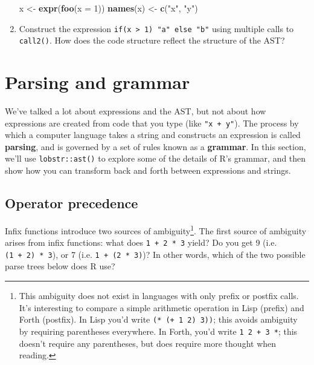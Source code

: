 \documentclass[]{book}
\newenvironment{Shaded}{\begin{snugshade}}{\end{snugshade}}
\newcommand{\DataTypeTok}[1]{\textcolor[rgb]{0.27,0.27,0.27}{#1}}
\newcommand{\DecValTok}[1]{\textcolor[rgb]{0.06,0.06,0.06}{#1}}
\newcommand{\KeywordTok}[1]{\textcolor[rgb]{0.27,0.27,0.27}{\textbf{#1}}}
\newcommand{\NormalTok}[1]{#1}
\newcommand{\StringTok}[1]{\textcolor[rgb]{0.5,0.5,0.5}{#1}}
\let\rmarkdownfootnote\footnote%
\def\footnote{\protect\rmarkdownfootnote}
\begin{document}
\begin{enumerate}
\begin{Shaded}
\begin{Highlighting}[]
\NormalTok{x <-}\StringTok{ }\KeywordTok{expr}\NormalTok{(}\KeywordTok{foo}\NormalTok{(}\DataTypeTok{x =} \DecValTok{1}\NormalTok{))}
\KeywordTok{names}\NormalTok{(x) <-}\StringTok{ }\KeywordTok{c}\NormalTok{(}\StringTok{"x"}\NormalTok{, }\StringTok{"y"}\NormalTok{)}
\end{Highlighting}
\end{Shaded}
\item
  Construct the expression \texttt{if(x\ \textgreater{}\ 1)\ "a"\ else\ "b"} using multiple calls to
  \texttt{call2()}. How does the code structure reflect the structure of the AST?
\end{enumerate}

\hypertarget{grammar}{%
\section{Parsing and grammar}\label{grammar}}


We've talked a lot about expressions and the AST, but not about how expressions are created from code that you type (like \texttt{"x\ +\ y"}). The process by which a computer language takes a string and constructs an expression is called \textbf{parsing}, and is governed by a set of rules known as a \textbf{grammar}. In this section, we'll use \texttt{lobstr::ast()} to explore some of the details of R's grammar, and then show how you can transform back and forth between expressions and strings.

\hypertarget{operator-precedence}{%
\subsection{Operator precedence}\label{operator-precedence}}


Infix functions introduce two sources of ambiguity\footnote{This ambiguity does not exist in languages with only prefix or postfix calls. It's interesting to compare a simple arithmetic operation in Lisp (prefix) and Forth (postfix). In Lisp you'd write \texttt{(*\ (+\ 1\ 2)\ 3))}; this avoids ambiguity by requiring parentheses everywhere. In Forth, you'd write \texttt{1\ 2\ +\ 3\ *}; this doesn't require any parentheses, but does require more thought when reading.}. The first source of ambiguity arises from infix functions: what does \texttt{1\ +\ 2\ *\ 3} yield? Do you get 9 (i.e. \texttt{(1\ +\ 2)\ *\ 3}), or 7 (i.e. \texttt{1\ +\ (2\ *\ 3)})? In other words, which of the two possible parse trees below does R use?
\end{document}
